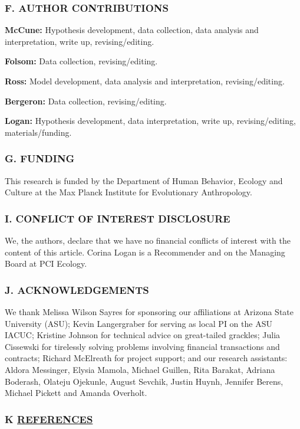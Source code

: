 \documentclass[]{article}
\begin{document}
\subsubsection{F. AUTHOR CONTRIBUTIONS}\label{f.-author-contributions}

\textbf{McCune:} Hypothesis development, data collection, data analysis
and interpretation, write up, revising/editing.

\textbf{Folsom:} Data collection, revising/editing.

\textbf{Ross:} Model development, data analysis and interpretation,
revising/editing.

\textbf{Bergeron:} Data collection, revising/editing.

\textbf{Logan:} Hypothesis development, data interpretation, write up,
revising/editing, materials/funding.

\subsubsection{G. FUNDING}\label{g.-funding}

This research is funded by the Department of Human Behavior, Ecology and
Culture at the Max Planck Institute for Evolutionary Anthropology.

\subsubsection{I. CONFLICT OF INTEREST
DISCLOSURE}\label{i.-conflict-of-interest-disclosure}

We, the authors, declare that we have no financial conflicts of interest
with the content of this article. Corina Logan is a Recommender and on
the Managing Board at PCI Ecology.

\subsubsection{J. ACKNOWLEDGEMENTS}\label{j.-acknowledgements}

We thank Melissa Wilson Sayres for sponsoring our affiliations at
Arizona State University (ASU); Kevin Langergraber for serving as local
PI on the ASU IACUC; Kristine Johnson for technical advice on
great-tailed grackles; Julia Cissewski for tirelessly solving problems
involving financial transactions and contracts; Richard McElreath for
project support; and our research assistants: Aldora Messinger, Elysia
Mamola, Michael Guillen, Rita Barakat, Adriana Boderash, Olateju
Ojekunle, August Sevchik, Justin Huynh, Jennifer Berens, Michael Pickett
and Amanda Overholt.

\subsubsection{\texorpdfstring{K
\href{MyLibrary.bib}{REFERENCES}}{K REFERENCES}}\label{k-references}
\end{document}
